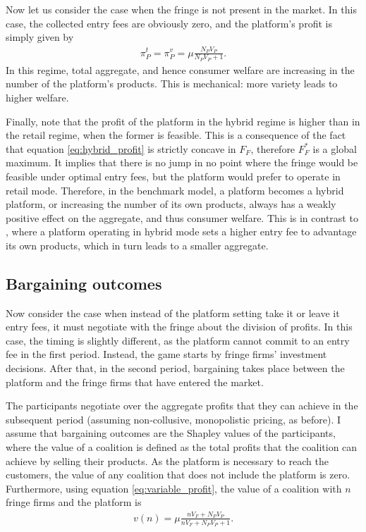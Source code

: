 \documentclass[a4paper]{article}
\begin{document}
Now let us consider the case when the fringe is not present in the market.
In this case, the collected entry fees are obviously zero, and the platform's profit is simply given by
\begin{align*}
    \pi_P^{t} = \pi_P^{v} = \mu \frac{ N_P V_P}{N_P V_P + 1}.
\end{align*}
In this regime, total aggregate, and hence consumer welfare are increasing in the number of the platform's products.
This is mechanical: more variety leads to higher welfare.

Finally, note that the profit of the platform in the hybrid regime is higher than in the retail regime, when the former is feasible.
This is a consequence of the fact that equation \eqref{eq:hybrid_profit} is strictly concave in $F_F$, therefore $F_F^*$ is a global maximum.
It implies that there is no jump in no point where the fringe would be feasible under optimal entry fees, but the platform would prefer to operate in retail mode.
Therefore, in the benchmark model, a platform becomes a hybrid platform, or increasing the number of its own products, always has a weakly positive effect on the aggregate, and thus consumer welfare.
This is in contrast to \textcite{anderson2021hybrid}, where a platform operating in hybrid mode sets a higher entry fee to advantage its own products, which in turn leads to a smaller aggregate.


\subsection{Bargaining outcomes}

Now consider the case when instead of the platform setting take it or leave it entry fees, it must negotiate with the fringe about the division of profits.
In this case, the timing is slightly different, as the platform cannot commit to an entry fee in the first period.
Instead, the game starts by fringe firms' investment decisions.
After that, in the second period, bargaining takes place between the platform and the fringe firms that have entered the market.


The participants negotiate over the aggregate profits that they can achieve in the subsequent period (assuming non-collusive, monopolistic pricing, as before).
I assume that bargaining outcomes are the Shapley values of the participants, where the value of a coalition is defined as the total profits that the coalition can achieve by selling their products.
As the platform is necessary to reach the customers, the value of any coalition that does not include the platform is zero.
Furthermore, using equation \eqref{eq:variable_profit}, the value of a coalition with $n$ fringe firms and the platform is
\begin{align*}
    v(n) = \mu \frac{n V_F + N_P V_P}{n V_F + N_P V_P + 1}.
\end{align*}
\end{document}
